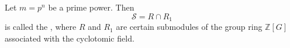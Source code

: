 Let $m = p^n$ be a prime power. Then
$$
\mathcal{S} = R \cap R_1
$$
is called the , where $R$ and $R_1$ are certain submodules of the group ring $\mathbb{Z}[G]$ associated with the cyclotomic field.
